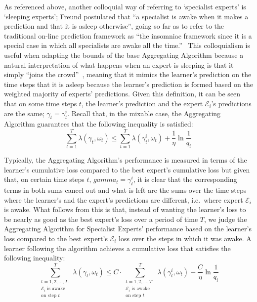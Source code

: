 As referenced above, another colloquial way of referring to `specialist experts' is `sleeping experts'; Freund postulated that ``a specialist is awake when it makes a prediction and that it is asleep otherwise'', going so far as to refer to the traditional on-line prediction framework as ``the insomniac framework since it is a special case in which all specialists are awake all the time.''~\cite{freund:1997} This colloquialism is useful when adapting the bounds of the base Aggregating Algorithm because a natural interpretation of what happens when an expert is sleeping is that it simply ``joins the crowd''~\cite{kalnishkan:2022}, meaning that it mimics the learner's prediction on the time steps that it is asleep because the learner's prediction is formed based on the weighted majority of experts' predictions. Given this definition, it can be seen that on some time steps $t$, the learner's prediction and the expert $\mathcal{E}_i$'s predictions are the same; $\gamma_t = \gamma_t^i$.
Recall that, in the mixable case, the Aggregating Algorithm guarantees that the following inequality is satisfied:
\begin{equation*}
    \overset{T}{\underset{t=1}{\sum}}\lambda(\gamma_t, \omega_t) \leq \overset{T}{\underset{t=1}{\sum}}\lambda(\gamma_t^i, \omega_t) + \frac{1}{\eta} \ln \frac{1}{q_i}
\end{equation*}

Typically, the Aggregating Algorithm's performance is measured in terms of the learner's cumulative loss compared to the best expert's cumulative loss but given that, on certain time steps $t$, $gamma_t = \gamma_t^i$, it is clear that the corresponding terms in both sums cancel out and what is left are the sums over the time steps where the learner's and the expert's predictions are different, i.e.\ where expert $\mathcal{E}_i$ is awake. What follows from this is that, instead of wanting the learner's loss to be nearly as good as the best expert's loss over a period of time $T$, we judge the Aggregating Algorithm for Specialist Experts' performance based on the learner's loss compared to the best expert's $\mathcal{E}_i$ loss over the steps in which it was awake. A learner following the algorithm achieves a cumulative loss that satisfies the following inequality:
\begin{equation}
    \overset{T}{\underset{\substack{t=1,2,\ldots,T:\\\mathcal{E}_i\text{ is awake}\\\text{on step }t}}{\sum}}\lambda(\gamma_t, \omega_t) \leq C \cdot \overset{T}{\underset{\substack{t=1,2,\ldots,T:\\\mathcal{E}_i\text{ is awake}\\\text{on step }t}}{\sum}} \lambda(\gamma^i_t, \omega_t) + \frac{C}{\eta}\ln\frac{1}{q_i}
\end{equation}

